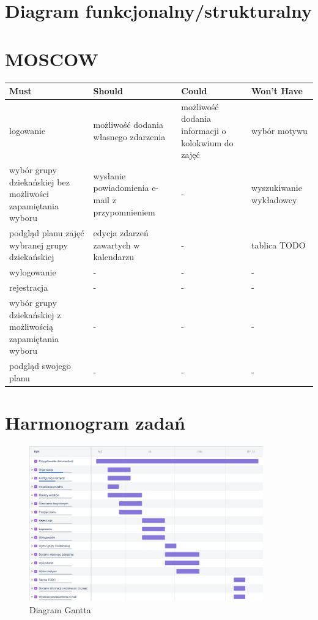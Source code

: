 \documentclass[a4paper,11pt]{uzreport}
\begin{document}
\section{Diagram funkcjonalny/strukturalny}

\clearpage
\section{MOSCOW}

\begin{center}
\begin{tabular}{ |m{4cm} | m{4cm} |m{4cm} | m{4cm} | } 
\hline
\textbf{Must} & \textbf{Should} & \textbf{Could} & \textbf{Won’t Have}\\
\hline
logowanie 	& możliwość dodania własnego zdarzenia & możliwość dodania informacji o kolokwium do zajęć & wybór motywu\\ 
\hline
wybór grupy dziekańskiej bez możliwości zapamiętania wyboru	& wysłanie powiadomienia e-mail z przypomnieniem & - & wyszukiwanie wykładowcy\\ 
\hline
podgląd planu zajęć wybranej grupy dziekańskiej 				& edycja zdarzeń zawartych w kalendarzu & - & tablica TODO\\ 
\hline
wylogowanie 										& - & - & -\\ 
\hline
rejestracja	& - & - & -\\ 
\hline
wybór grupy dziekańskiej z możliwością zapamiętania wyboru	& - & - & -\\ 
\hline
podgląd swojego planu 								& - & - & -\\ 
\hline
\end{tabular}
\end{center}

\section{Harmonogram zadań}
    
    \begin{figure}[ht!]
	\vspace{-15pt}
        \centering
        \includegraphics[width=0.9\textwidth]{pictures/fabulous_uz_planner_2020-10-27_06.13pm.png}
        \caption{Diagram Gantta}
	\vspace{-30pt}
     \end{figure}
\end{document}
